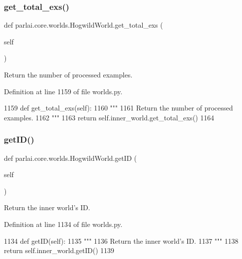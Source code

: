 \subsubsection{\texorpdfstring{get\+\_\+total\+\_\+exs()}{get\_total\_exs()}}
{\footnotesize\ttfamily def parlai.\+core.\+worlds.\+Hogwild\+World.\+get\+\_\+total\+\_\+exs (\begin{DoxyParamCaption}\item[{}]{self }\end{DoxyParamCaption})}

\begin{DoxyVerb}Return the number of processed examples.
\end{DoxyVerb}
 

Definition at line 1159 of file worlds.\+py.


\begin{DoxyCode}
1159     \textcolor{keyword}{def }get\_total\_exs(self):
1160         \textcolor{stringliteral}{"""}
1161 \textcolor{stringliteral}{        Return the number of processed examples.}
1162 \textcolor{stringliteral}{        """}
1163         \textcolor{keywordflow}{return} self.inner\_world.get\_total\_exs()
1164 
\end{DoxyCode}
\mbox{\label{classparlai_1_1core_1_1worlds_1_1HogwildWorld_a67379773119cebd6ac70fce2abcb19a9}} 
\subsubsection{\texorpdfstring{get\+I\+D()}{getID()}}
{\footnotesize\ttfamily def parlai.\+core.\+worlds.\+Hogwild\+World.\+get\+ID (\begin{DoxyParamCaption}\item[{}]{self }\end{DoxyParamCaption})}

\begin{DoxyVerb}Return the inner world's ID.
\end{DoxyVerb}
 

Definition at line 1134 of file worlds.\+py.


\begin{DoxyCode}
1134     \textcolor{keyword}{def }getID(self):
1135         \textcolor{stringliteral}{"""}
1136 \textcolor{stringliteral}{        Return the inner world's ID.}
1137 \textcolor{stringliteral}{        """}
1138         \textcolor{keywordflow}{return} self.inner\_world.getID()
1139 
\end{DoxyCode}
\mbox{\label{classparlai_1_1core_1_1worlds_1_1HogwildWorld_ae0b4dc3d2bb4d1dbda7970da03da1a6e}} 
